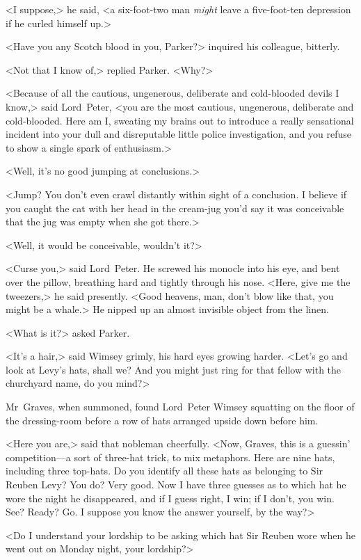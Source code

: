 <I suppose,> he said, <a six-foot-two man \textit{might} leave a five-foot-ten depression if he curled himself up.>

<Have you any Scotch blood in you, Parker?> inquired his colleague, bitterly.

<Not that I know of,> replied Parker. <Why?>

<Because of all the cautious, ungenerous, deliberate and cold-blooded devils I know,> said Lord~Peter, <you are the most cautious, ungenerous, deliberate and cold-blooded. Here am I\@, sweating my brains out to introduce a really sensational incident into your dull and disreputable little police investigation, and you refuse to show a single spark of enthusiasm.>

<Well, it's no good jumping at conclusions.>

<Jump? You don't even crawl distantly within sight of a conclusion. I believe if you caught the cat with her head in the cream-jug you'd say it was conceivable that the jug was empty when she got there.>

<Well, it would be conceivable, wouldn't it?>

<Curse you,> said Lord~Peter. He screwed his monocle into his eye, and bent over the pillow, breathing hard and tightly through his nose. <Here, give me the tweezers,> he said presently. <Good heavens, man, don't blow like that, you might be a whale.> He nipped up an almost invisible object from the linen.

<What is it?> asked Parker.

<It's a hair,> said Wimsey grimly, his hard eyes growing harder. <Let's go and look at Levy's hats, shall we? And you might just ring for that fellow with the churchyard name, do you mind?>

Mr~Graves, when summoned, found Lord~Peter Wimsey squatting on the floor of the dressing-room before a row of hats arranged upside down before him.

<Here you are,> said that nobleman cheerfully. <Now, Graves, this is a guessin' competition—a sort of three-hat trick, to mix metaphors. Here are nine hats, including three top-hats. Do you identify all these hats as belonging to Sir Reuben Levy? You do? Very good. Now I have three guesses as to which hat he wore the night he disappeared, and if I guess right, I win; if I don't, you win. See? Ready? Go. I suppose you know the answer yourself, by the way?>

<Do I understand your lordship to be asking which hat Sir Reuben wore when he went out on Monday night, your lordship?>

